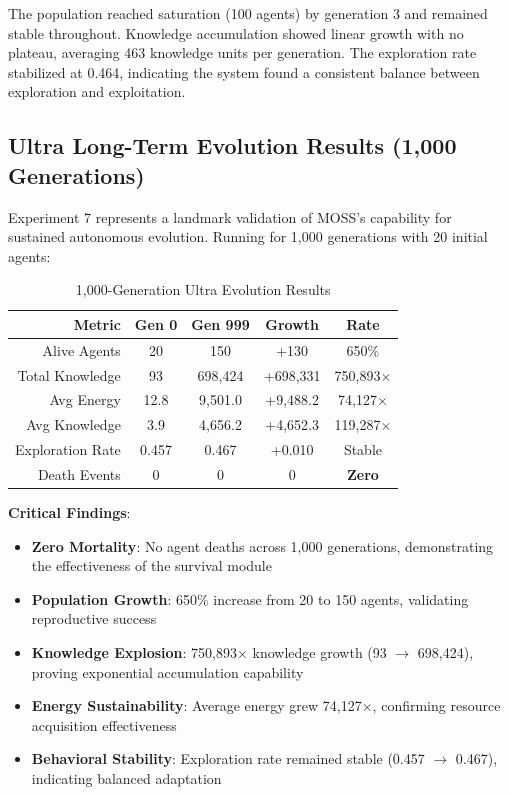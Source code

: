 \documentclass[10pt,a4paper]{article}
\begin{document}
The population reached saturation (100 agents) by generation 3 and remained stable throughout. Knowledge accumulation showed linear growth with no plateau, averaging 463 knowledge units per generation. The exploration rate stabilized at 0.464, indicating the system found a consistent balance between exploration and exploitation.

\subsection{Ultra Long-Term Evolution Results (1,000 Generations)}

Experiment 7 represents a landmark validation of MOSS's capability for sustained autonomous evolution. Running for 1,000 generations with 20 initial agents:

\begin{table}[h]
\centering
\caption{1,000-Generation Ultra Evolution Results}
\begin{tabular}{@{}rcccc@{}}
\toprule
\textbf{Metric} & \textbf{Gen 0} & \textbf{Gen 999} & \textbf{Growth} & \textbf{Rate} \\
\midrule
Alive Agents & 20 & 150 & +130 & 650\% \\
Total Knowledge & 93 & 698,424 & +698,331 & 750,893$\times$ \\
Avg Energy & 12.8 & 9,501.0 & +9,488.2 & 74,127$\times$ \\
Avg Knowledge & 3.9 & 4,656.2 & +4,652.3 & 119,287$\times$ \\
Exploration Rate & 0.457 & 0.467 & +0.010 & Stable \\
Death Events & 0 & 0 & 0 & \textbf{Zero} \\
\bottomrule
\end{tabular}
\end{table}

\textbf{Critical Findings}:
\begin{itemize}
    \item \textbf{Zero Mortality}: No agent deaths across 1,000 generations, demonstrating the effectiveness of the survival module
    \item \textbf{Population Growth}: 650\% increase from 20 to 150 agents, validating reproductive success
    \item \textbf{Knowledge Explosion}: 750,893$\times$ knowledge growth (93 $\rightarrow$ 698,424), proving exponential accumulation capability
    \item \textbf{Energy Sustainability}: Average energy grew 74,127$\times$, confirming resource acquisition effectiveness
    \item \textbf{Behavioral Stability}: Exploration rate remained stable (0.457 $\rightarrow$ 0.467), indicating balanced adaptation
\end{itemize}
\end{document}
